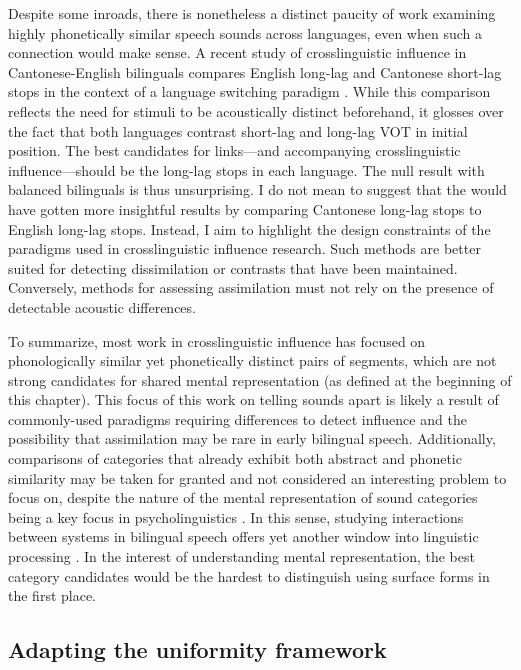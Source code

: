 Despite some inroads, there is nonetheless a distinct paucity of work examining highly phonetically similar speech sounds across languages, even when such a connection would make sense. A recent study of crosslinguistic influence in Cantonese-English bilinguals compares English long-lag and Cantonese short-lag stops in the context of a language switching paradigm \citep{tsui_2019_switching}. While this comparison reflects the need for stimuli to be acoustically distinct beforehand, it glosses over the fact that both languages contrast short-lag and long-lag VOT in initial position. The best candidates for links---and accompanying crosslinguistic influence---should be the long-lag stops in each language. The null result with balanced bilinguals is thus unsurprising. I do not mean to suggest that the \citep{tsui_2019_switching} would have gotten more insightful results by comparing Cantonese long-lag stops to English long-lag stops. Instead, I aim to highlight the design constraints of the paradigms used in crosslinguistic influence research. Such methods are better suited for detecting dissimilation or contrasts that have been maintained. Conversely, methods for assessing assimilation must not rely on the presence of detectable acoustic differences.

To summarize, most work in crosslinguistic influence has focused on phonologically similar yet phonetically distinct pairs of segments, which are not strong candidates for shared mental representation (as defined at the beginning of this chapter). This focus of this work on telling sounds apart is likely a result of commonly-used paradigms requiring differences to detect influence and the possibility that assimilation may be rare in early bilingual speech. Additionally, comparisons of categories that already exhibit both abstract and phonetic similarity may be taken for granted and not considered an interesting problem to focus on, despite the nature of the mental representation of sound categories being a key focus in psycholinguistics \citep{samuel_2020_resist}. In this sense, studying interactions between systems in bilingual speech offers yet another window into linguistic processing \citep{fricke_2019_bilingualism}. In the interest of understanding mental representation, the best category candidates would be the hardest to distinguish using surface forms in the first place. 

\subsection{Adapting the uniformity framework}\label{ch4:sec:uniformity}

